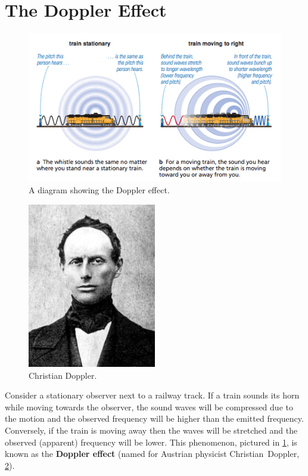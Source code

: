 \documentclass[a4paper]{amsbook}
\theoremstyle{definition}
\numberwithin{exercise}{chapter}
\numberwithin{exercise}{chapter}
\begin{document}
\section{The Doppler Effect}
\begin{figure}
  \centering
  \includegraphics[width=\textwidth]{doppler}
  \caption{A diagram showing the Doppler effect.}\label{fig:doppler}
\end{figure}
\begin{figure}
  \centering
  \includegraphics[width=0.5\textwidth]{doppler2}
  \caption{Christian Doppler.}\label{fig:doppler2}
\end{figure}
Consider a stationary observer next to a railway track. If a train sounds its horn while moving towards the observer,
the sound waves will be compressed due to the motion and the observed frequency will be higher than the emitted frequency.
Conversely, if the train is moving away then the waves will be stretched and the observed (apparent) frequency will be lower. This
phenomenon, pictured in \cref{fig:doppler}, is known as the \textbf{Doppler effect} (named for Austrian physicist Christian~Doppler, \cref{fig:doppler2}).
\end{document}
